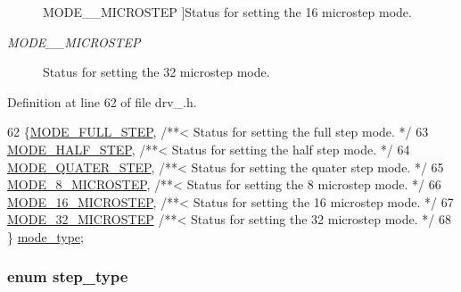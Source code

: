 \begin{Desc}
\begin{description}
{\hypertarget{group__DRV8825_gga19269c193c0c4866cdc4e5abd433f9fcac75bcca2721976d5185711ca481ccbb0}{M\-O\-D\-E\-\_\-\_\-\-M\-I\-C\-R\-O\-S\-T\-E\-P}\label{group__DRV8825_gga19269c193c0c4866cdc4e5abd433f9fcac75bcca2721976d5185711ca481ccbb0}
}]Status for setting the 16 microstep mode. \item[{\em 
\hypertarget{group__DRV8825_gga19269c193c0c4866cdc4e5abd433f9fcacb3d9ffb67d18343290fe5474bc1b4d5}{M\-O\-D\-E\-\_\-32\-\_\-\-M\-I\-C\-R\-O\-S\-T\-E\-P}\label{group__DRV8825_gga19269c193c0c4866cdc4e5abd433f9fcacb3d9ffb67d18343290fe5474bc1b4d5}
}]Status for setting the 32 microstep mode. \end{description}
\end{Desc}


Definition at line 62 of file drv\-\_.\-h.


\begin{DoxyCode}
62              \{\hyperlink{group__DRV8825_gga19269c193c0c4866cdc4e5abd433f9fcaed3032a935a3b2a2ab90e2500dee1177}{MODE\_FULL\_STEP},   \textcolor{comment}{/**< Status for setting the full step mode. */}
63         \hyperlink{group__DRV8825_gga19269c193c0c4866cdc4e5abd433f9fca7bf7cb276c55a5c4e13149d1e18b320f}{MODE\_HALF\_STEP},         \textcolor{comment}{/**< Status for setting the half step mode. */}
64         \hyperlink{group__DRV8825_gga19269c193c0c4866cdc4e5abd433f9fcaf16653dd137a6079ff5399de04861835}{MODE\_QUATER\_STEP},       \textcolor{comment}{/**< Status for setting the quater step mode. */}
65         \hyperlink{group__DRV8825_gga19269c193c0c4866cdc4e5abd433f9fca4db57f4a88897e48818d92a223cd72d7}{MODE\_8\_MICROSTEP},       \textcolor{comment}{/**< Status for setting the 8 microstep mode. */}
66         \hyperlink{group__DRV8825_gga19269c193c0c4866cdc4e5abd433f9fcac75bcca2721976d5185711ca481ccbb0}{MODE\_16\_MICROSTEP},      \textcolor{comment}{/**< Status for setting the 16 microstep mode. */}
67         \hyperlink{group__DRV8825_gga19269c193c0c4866cdc4e5abd433f9fcacb3d9ffb67d18343290fe5474bc1b4d5}{MODE\_32\_MICROSTEP}       \textcolor{comment}{/**< Status for setting the 32 microstep mode. */}
68         \} \hyperlink{group__DRV8825_ga19269c193c0c4866cdc4e5abd433f9fc}{mode\_type};
\end{DoxyCode}
\hypertarget{group__DRV8825_ga3af682b92aa259509aea217f6dc64356}{
\subsubsection[{step\-\_\-type}]{\setlength{\rightskip}{0pt plus 5cm}enum {\bf step\-\_\-type}}}\label{group__DRV8825_ga3af682b92aa259509aea217f6dc64356}


